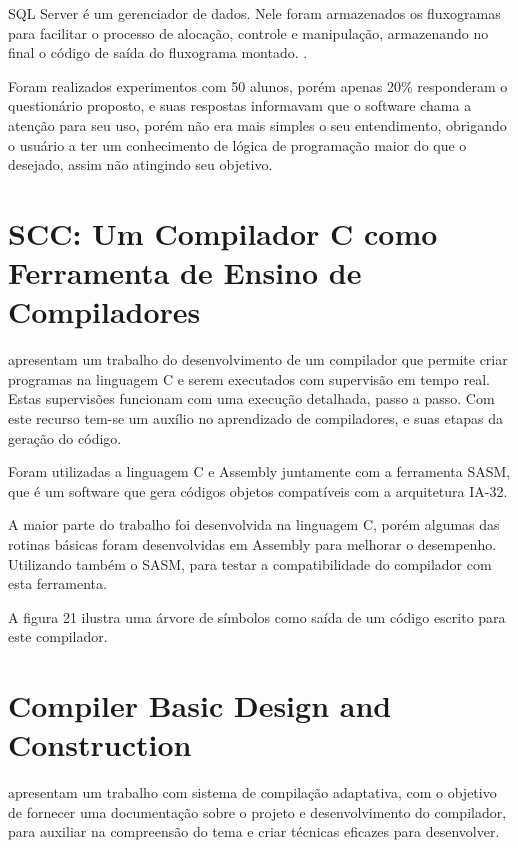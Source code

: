 \documentclass[12pt,oneside,a4paper,chapter=TITLE,section=TITLE,sumario=tradicional]{abntex2}
\begin{document}
SQL Server é um gerenciador de dados. Nele foram armazenados os fluxogramas para facilitar o processo de alocação, controle e manipulação, armazenando no final o código de saída do fluxograma montado. \cite{juliana2015}.

Foram realizados experimentos com 50 alunos, porém apenas 20\% responderam o questionário proposto, e suas respostas informavam que o software chama a atenção para seu uso, porém não era mais simples o seu entendimento, obrigando o usuário a ter um conhecimento de lógica de programação maior do que o desejado, assim não atingindo seu objetivo. 

\section{SCC: Um Compilador C como Ferramenta de Ensino de Compiladores}
\label{sec:scc}
 
\cite{juliano2009} apresentam um trabalho do desenvolvimento de um compilador que permite criar programas na linguagem C e serem executados com supervisão em tempo real. Estas supervisões funcionam com uma execução detalhada, passo a passo. Com este recurso tem-se um auxílio no aprendizado de compiladores, e suas etapas da geração do código.

Foram utilizadas a linguagem C e Assembly juntamente com a ferramenta SASM, que é um software que gera códigos objetos compatíveis com a arquitetura IA-32.

A maior parte do trabalho foi desenvolvida na linguagem C, porém algumas das rotinas básicas foram desenvolvidas em Assembly para melhorar o desempenho. Utilizando também o SASM, para testar a compatibilidade do compilador com esta ferramenta.

A figura 21 ilustra uma árvore de símbolos como saída de um código escrito para este compilador. 

\begin{figure}[htb]
\end{figure}

\section{Compiler Basic Design and Construction}
\label{sec:compiler-basic}

\cite{mahak2009} apresentam um trabalho com sistema de compilação adaptativa, com o objetivo de fornecer uma documentação sobre o projeto e desenvolvimento do compilador, para auxiliar na compreensão do tema e criar técnicas eficazes para desenvolver.
\end{document}
